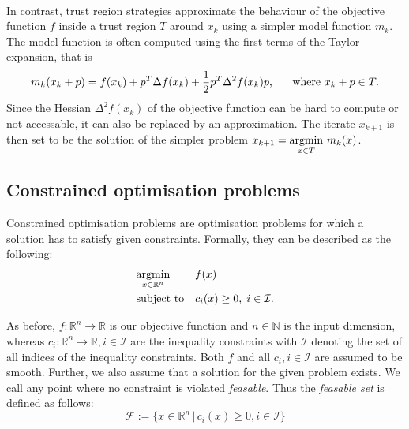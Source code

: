 \\ \indent In contrast, trust region strategies approximate the behaviour of the objective function $f$ inside a trust region $T$ around $x_k$ using a simpler model function $m_k$. The model function is often computed using the first terms of the Taylor expansion, that is \[m_k(x_k + p) = f(x_k) + p^T\Delta f(x_k) + \frac{1}{2}p^T\Delta^2 f(x_k) p \text{, \indent where } x_k + p \in T.\] Since the Hessian $\Delta^2 f(x_k)$ of the objective function can be hard to compute or not accessable, it can also be replaced by an approximation. The iterate $x_{k+1}$ is then set to be the solution of the simpler problem $x_{k+1} = \underset{x \in T}{\operatorname*{argmin} }  \,\,m_k(x)$.

\subsection{Constrained optimisation problems}
Constrained optimisation problems are optimisation problems for which a solution has to satisfy given constraints. Formally, they can be described as the following:\\
\begin{equation}
	\label{constrained_min_problem}
	\begin{aligned}
		& \underset{x \in \mathbb{R}^n}{\operatorname*{argmin}}
		& & f(x) \\
		& \text{subject to}
		& & c_i(x) \geq 0, \; i \in \mathcal{I}.
	\end{aligned}
\end{equation}

As before, $f\colon \mathbb{R}^n\to \mathbb{R}$ is our objective function and $n \in \mathbb{N}$ is the input dimension, whereas $c_i\colon \mathbb{R}^n\to \mathbb{R}, i \in \mathcal{I}$ are the inequality constraints with $\mathcal{I}$ denoting the set of all indices of the inequality constraints. Both $f$ and all $c_i, i \in \mathcal{I}$ are assumed to be smooth. Further, we also assume that a solution for the given problem exists. We call any point where no constraint is violated \textit{feasable}. Thus the \textit{feasable set} is defined as follows:
\[ \mathcal{F} := \{x \in \mathbb{R}^n \,|\, c_i(x) \geq 0, i\in \mathcal{I} \} \]

